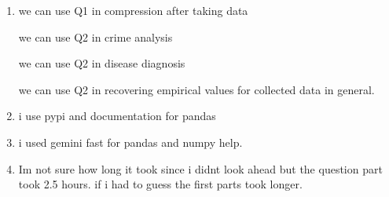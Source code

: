 \documentclass{article}
\begin{document}
\begin{enumerate}
    \item we can use Q1 in compression after taking data

    we can use Q2 in crime analysis

    we can use Q2 in disease diagnosis

    we can use Q2 in recovering empirical values for collected data in general. 

    \item i use pypi and documentation for pandas
    \item i used gemini fast for pandas and numpy help. 
    \item Im not sure how long it took since i didnt look ahead but the question part took 2.5 hours. if i had to guess the first parts took longer. 
\end{enumerate}
\end{document}

